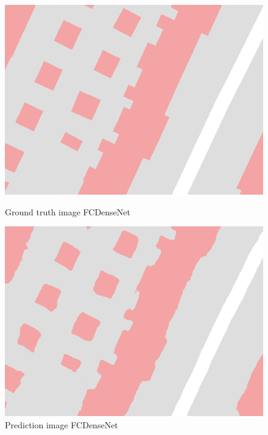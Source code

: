 \documentclass[]{IEEEtran}
\begin{document}
\begin{figure}[!hbt]
	\begin{center}
		\vspace{-0.3cm}
		\begin{minipage}[t]{0.21\textwidth}
			\includegraphics[width=\columnwidth]{fc_SAT01-00008_gt}
			\caption{Ground truth image FCDenseNet}
			\label{fig:fcd_gt}
		\end{minipage}
		\hspace{0.5cm}
		\begin{minipage}[t]{0.21\textwidth}
			\includegraphics[width=\columnwidth]{fc_SAT01-00008_pred}
			\caption{Prediction image FCDenseNet}
			\label{fig:fcd_pr}
		\end{minipage}
	\end{center}
\end{figure}
\end{document}
